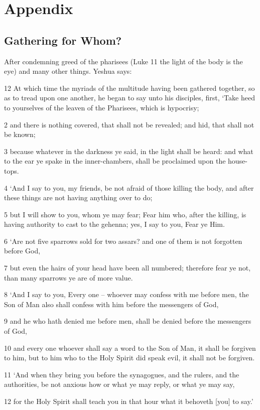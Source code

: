 \documentclass[11pt]{article}
\begin{document}
\section{Appendix}
\subsection{Gathering for Whom? } \label{gathering for whom}
After condemning greed of the pharisees (Luke 11 the light of the body is the eye) and many other things. Yeshua says:

12 At which time the myriads of the multitude having been gathered together, so as to tread upon one another, he began to say unto his disciples, first, `Take heed to yourselves of the leaven of the Pharisees, which is hypocrisy;

2 and there is nothing covered, that shall not be revealed; and hid, that shall not be known;

3 because whatever in the darkness ye said, in the light shall be heard: and what to the ear ye spake in the inner-chambers, shall be proclaimed upon the house-tops.

4 `And I say to you, my friends, be not afraid of those killing the body, and after these things are not having anything over to do;

5 but I will show to you, whom ye may fear; Fear him who, after the killing, is having authority to cast to the gehenna; yes, I say to you, Fear ye Him.

6 `Are not five sparrows sold for two assars? and one of them is not forgotten before God,

7 but even the hairs of your head have been all numbered; therefore fear ye not, than many sparrows ye are of more value.

8 `And I say to you, Every one -- whoever may confess with me before men, the Son of Man also shall confess with him before the messengers of God,

9 and he who hath denied me before men, shall be denied before the messengers of God,

10 and every one whoever shall say a word to the Son of Man, it shall be forgiven to him, but to him who to the Holy Spirit did speak evil, it shall not be forgiven.

11 `And when they bring you before the synagogues, and the rulers, and the authorities, be not anxious how or what ye may reply, or what ye may say,

12 for the Holy Spirit shall teach you in that hour what it behoveth [you] to say.'
\end{document}
